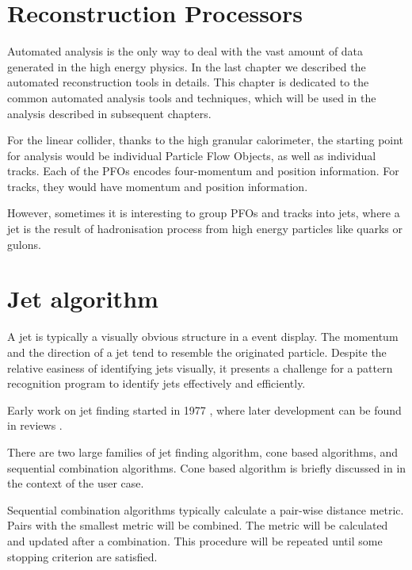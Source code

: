 \section{Reconstruction Processors}

Automated analysis is the only way to deal with the vast amount of data generated in the high energy physics. In the last chapter we described the automated reconstruction tools in details. This chapter is dedicated to the common automated analysis tools and techniques, which will be used in the analysis described in subsequent chapters.

For the linear collider, thanks to the high granular calorimeter, the starting point for analysis would be individual Particle Flow Objects, as well as individual tracks. Each of the PFOs encodes four-momentum and position information. For tracks, they would have momentum and position information.

However, sometimes it is interesting to group PFOs and tracks into jets, where a jet is the result of hadronisation process from high energy particles like quarks or gulons.

\section{Jet algorithm}

A jet is typically a visually obvious structure in a event display. The momentum and the direction of a jet tend to resemble the originated particle. Despite the relative easiness of identifying jets visually, it presents a challenge for a pattern recognition program to identify jets effectively and efficiently.

Early work on jet finding started in 1977 \cite{Sterman:1977wj}, where later development can be found in reviews \cite{Moretti:1998qx,Salam:2009jx,Ali:2010tw}.

There are two large families of jet finding algorithm, cone based algorithms, and sequential combination algorithms. Cone based algorithm is briefly discussed in  in the context of the \pandora user case.

Sequential combination algorithms typically calculate a pair-wise distance metric. Pairs with the smallest metric will be combined. The metric will be calculated and updated after a combination. This procedure will be repeated until some stopping criterion are satisfied.

